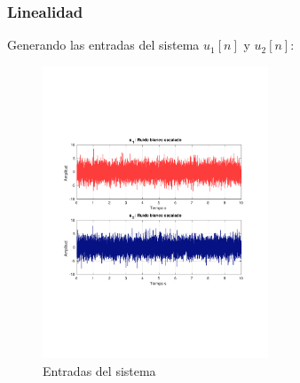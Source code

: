 		\subsubsection{Linealidad}
			Generando las entradas del sistema $u_{1}[n]$ y $u_{2}[n]$:
			\begin{figure}[H]
				\center
				\includegraphics[width=0.6\textwidth,clip, trim = {2cm 7.0cm 2.2cm 7.0cm}]{../imgs/sistema_2_linealidad_entradas.pdf}
				\caption{Entradas del sistema}
				\label{fig:s_2_lineality_inputs}
			\end{figure}
		
